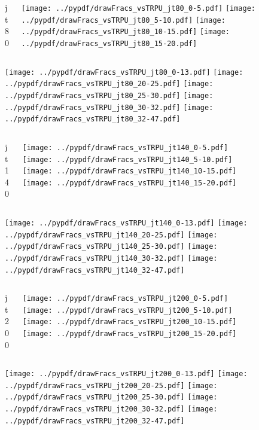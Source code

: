 \documentclass[aspectratio=169]{beamer}
\begin{document}
\begin{figure}[p]
\flushleft
\begin{columns}[T]
\begin{column}{.2\linewidth}
\centering
jt80
\end{column}
\begin{column}{.8\linewidth}
\texttt{[image: ../pypdf/drawFracs\_vsTRPU\_jt80\_0-5.pdf]}
\texttt{[image: ../pypdf/drawFracs\_vsTRPU\_jt80\_5-10.pdf]}
\texttt{[image: ../pypdf/drawFracs\_vsTRPU\_jt80\_10-15.pdf]}
\texttt{[image: ../pypdf/drawFracs\_vsTRPU\_jt80\_15-20.pdf]}
\end{column}
\end{columns}
\texttt{[image: ../pypdf/drawFracs\_vsTRPU\_jt80\_0-13.pdf]}
\texttt{[image: ../pypdf/drawFracs\_vsTRPU\_jt80\_20-25.pdf]}
\texttt{[image: ../pypdf/drawFracs\_vsTRPU\_jt80\_25-30.pdf]}
\texttt{[image: ../pypdf/drawFracs\_vsTRPU\_jt80\_30-32.pdf]}
\texttt{[image: ../pypdf/drawFracs\_vsTRPU\_jt80\_32-47.pdf]}
\end{figure}

\begin{figure}[p]
\flushleft
\begin{columns}[T]
\begin{column}{.2\linewidth}
\centering
jt140
\end{column}
\begin{column}{.8\linewidth}
\texttt{[image: ../pypdf/drawFracs\_vsTRPU\_jt140\_0-5.pdf]}
\texttt{[image: ../pypdf/drawFracs\_vsTRPU\_jt140\_5-10.pdf]}
\texttt{[image: ../pypdf/drawFracs\_vsTRPU\_jt140\_10-15.pdf]}
\texttt{[image: ../pypdf/drawFracs\_vsTRPU\_jt140\_15-20.pdf]}
\end{column}
\end{columns}
\texttt{[image: ../pypdf/drawFracs\_vsTRPU\_jt140\_0-13.pdf]}
\texttt{[image: ../pypdf/drawFracs\_vsTRPU\_jt140\_20-25.pdf]}
\texttt{[image: ../pypdf/drawFracs\_vsTRPU\_jt140\_25-30.pdf]}
\texttt{[image: ../pypdf/drawFracs\_vsTRPU\_jt140\_30-32.pdf]}
\texttt{[image: ../pypdf/drawFracs\_vsTRPU\_jt140\_32-47.pdf]}
\end{figure}

\begin{figure}[p]
\flushleft
\begin{columns}[T]
\begin{column}{.2\linewidth}
\centering
jt200
\end{column}
\begin{column}{.8\linewidth}
\texttt{[image: ../pypdf/drawFracs\_vsTRPU\_jt200\_0-5.pdf]}
\texttt{[image: ../pypdf/drawFracs\_vsTRPU\_jt200\_5-10.pdf]}
\texttt{[image: ../pypdf/drawFracs\_vsTRPU\_jt200\_10-15.pdf]}
\texttt{[image: ../pypdf/drawFracs\_vsTRPU\_jt200\_15-20.pdf]}
\end{column}
\end{columns}
\texttt{[image: ../pypdf/drawFracs\_vsTRPU\_jt200\_0-13.pdf]}
\texttt{[image: ../pypdf/drawFracs\_vsTRPU\_jt200\_20-25.pdf]}
\texttt{[image: ../pypdf/drawFracs\_vsTRPU\_jt200\_25-30.pdf]}
\texttt{[image: ../pypdf/drawFracs\_vsTRPU\_jt200\_30-32.pdf]}
\texttt{[image: ../pypdf/drawFracs\_vsTRPU\_jt200\_32-47.pdf]}
\end{figure}
\end{document}
